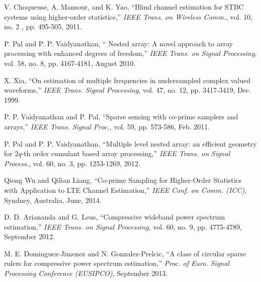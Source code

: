 \documentclass[letterpaper,10pt]{article}
\begin{document}
\begin{thebibliography}{1}
   V. Choqueuse, A. Mansour, and K. Yao, ``Blind channel estimation for STBC systems using higher-order statistics,'' \emph{IEEE Trans. on Wireless Comm.}, vol. 10, no. 2 , pp. 495-505, 2011.

   P. Pal and P. P. Vaidyanathan, `` Nested array: A novel approach to array processing with enhanced degrees of freedom,'' \emph{IEEE Trans. on Signal Processing}, vol. 58, no. 8, pp. 4167-4181, August 2010.

  X. Xia, ``On estimation of multiple frequencies in undersampled complex valued waveforms,'' \emph{IEEE Trans. Signal Processing}, vol. 47, no. 12, pp. 3417-3419, Dec. 1999.

  P. P. Vaidyanathan and P. Pal, ``Sparse sensing with co-prime samplers and arrays,'' \emph{IEEE Trans. Signal Proc.}, vol. 59, pp. 573-586, Feb. 2011.

   P. Pal and P. P. Vaidyanathan, ``Multiple level nested array: an efficient geometry for $2q$-th order cumulant based array processing,'' \emph{IEEE Trans. on Signal Process.}, vol. 60, no. 3, pp. 1253-1269, 2012.

   Qiong Wu and Qilian Liang, ``Co-prime Sampling for Higher-Order Statistics with Application to LTE Channel Estimation,'' \emph{IEEE Conf. on Comm. (ICC)}, Syndney, Australia, June, 2014.

   D. D. Ariananda and G. Leus, ``Compressive wideband power spectrum estimation,'' \emph{IEEE Trans. on Signal Processing}, vol. 60, no. 9, pp. 4775-4789, September 2012.

   M. E. Dominguez-Jimenez and N. Gonzalez-Prelcic, ``A class of circular sparse rulers for compressive power spectrum estimation,'' \emph{Proc. of Euro. Signal Processing Conference (EUSIPCO)}, September 2013.

\end{thebibliography}

\pagebreak
\end{document}
